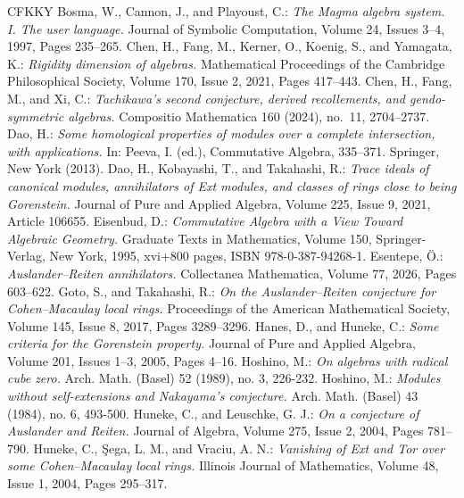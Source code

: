 \documentclass[a4paper]{amsart}
\theoremstyle{definition}
\theoremstyle{remark}
\numberwithin{equation}{section}
\begin{document}
\begin{thebibliography}{CFKKY}
 Bosma, W., Cannon, J., and Playoust, C.: {\it The Magma algebra system. I. The user language.} Journal of Symbolic Computation, Volume 24, Issues 3--4, 1997, Pages 235--265.
 Chen, H., Fang, M., Kerner, O., Koenig, S., and Yamagata, K.: {\it Rigidity dimension of algebras.} Mathematical Proceedings of the Cambridge Philosophical Society, Volume 170, Issue 2, 2021, Pages 417--443.
 Chen, H., Fang, M., and Xi, C.: {\it Tachikawa's second conjecture, derived recollements, and gendo-symmetric algebras.} Compositio Mathematica 160 (2024), no.~11, 2704--2737.
 Dao, H.: {\it Some homological properties of modules over a complete intersection, with applications.} In: Peeva, I. (ed.), Commutative Algebra, 335--371. Springer, New York (2013).
 Dao, H., Kobayashi, T., and Takahashi, R.: {\it Trace ideals of canonical modules, annihilators of Ext modules, and classes of rings close to being Gorenstein.} Journal of Pure and Applied Algebra, Volume 225, Issue 9, 2021, Article 106655.
 Eisenbud, D.: {\it Commutative Algebra with a View Toward Algebraic Geometry.} Graduate Texts in Mathematics, Volume 150, Springer-Verlag, New York, 1995, xvi+800 pages, ISBN 978-0-387-94268-1.
 Esentepe, \"O.: {\it Auslander--Reiten annihilators.} Collectanea Mathematica, Volume 77, 2026, Pages 603--622.
 Goto, S., and Takahashi, R.: {\it On the Auslander--Reiten conjecture for Cohen--Macaulay local rings.} Proceedings of the American Mathematical Society, Volume 145, Issue 8, 2017, Pages 3289--3296.
 Hanes, D., and Huneke, C.: {\it Some criteria for the Gorenstein property.} Journal of Pure and Applied Algebra, Volume 201, Issues 1--3, 2005, Pages 4--16.
 Hoshino, M.: {\it On algebras with radical cube zero.} Arch. Math. (Basel) 52 (1989), no. 3, 226-232.
 Hoshino, M.: {\it Modules without self-extensions and Nakayama's conjecture.} Arch. Math. (Basel) 43 (1984), no. 6, 493-500.
 Huneke, C., and Leuschke, G. J.: {\it On a conjecture of Auslander and Reiten.} Journal of Algebra, Volume 275, Issue 2, 2004, Pages 781--790.
 Huneke, C., \c{S}ega, L. M., and Vraciu, A. N.: {\it Vanishing of Ext and Tor over some Cohen--Macaulay local rings.} Illinois Journal of Mathematics, Volume 48, Issue 1, 2004, Pages 295--317.

\end{thebibliography}
\end{document}
